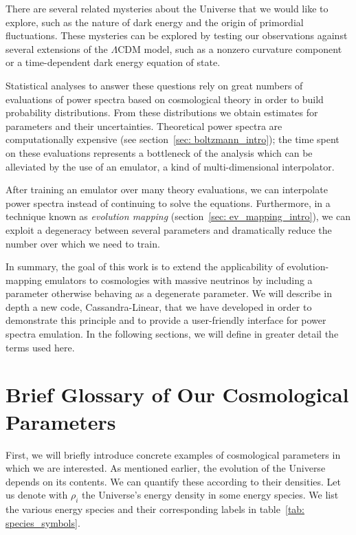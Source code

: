 There are several related mysteries about the Universe that we would like to
explore, such as the nature of dark energy and the origin of primordial
fluctuations. These mysteries can be explored by testing our observations
against several extensions of the $\Lambda$CDM model, such as a nonzero 
curvature component or a time-dependent dark energy equation of state. 

Statistical analyses to answer these questions rely on great numbers of
evaluations of power spectra based on cosmological theory in order to build 
probability 
distributions. From these distributions we obtain estimates for parameters and 
their
uncertainties. Theoretical power spectra are computationally expensive 
(see section~\ref{sec: boltzmann_intro}); the time spent on these evaluations
represents a bottleneck of the analysis which can be alleviated by the
use of an emulator, a kind of multi-dimensional interpolator.

After training an emulator over many theory evaluations, we can interpolate
power spectra instead of continuing to solve the equations. Furthermore, in
a technique known as \textit{evolution mapping}
(section~\ref{sec: ev_mapping_intro}), we can exploit a degeneracy between 
several parameters and dramatically reduce the number over which
we need to train. 

In summary, the goal of this work is to extend the applicability of
evolution-mapping emulators to cosmologies with massive neutrinos by
including a parameter otherwise behaving as a degenerate parameter. We
will describe in depth a new code, Cassandra-Linear, that we have developed
in order to demonstrate this principle and to provide a user-friendly
interface for power spectra emulation. In the
following sections, we will define in greater detail the terms used here.

\section{Brief Glossary of Our Cosmological Parameters}
\label{sec: param_glossary}


First, we will briefly introduce concrete
examples of cosmological parameters in which we are interested. As mentioned 
earlier, the evolution of the Universe depends on its contents.
We can quantify these according to their densities. Let us denote with
$\rho_i$ the Universe's energy density in some energy species. We list the 
various energy species and their corresponding labels in
table~\ref{tab: species_symbols}.

